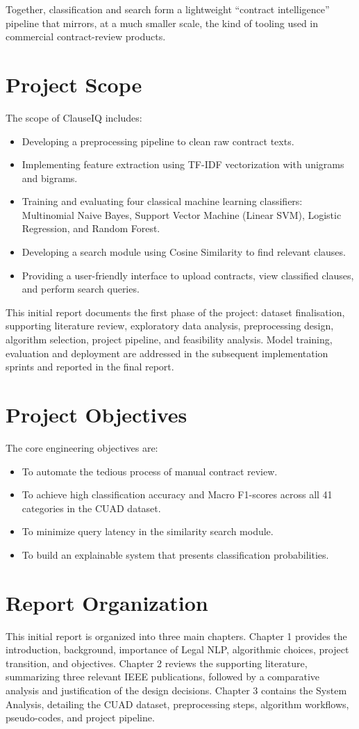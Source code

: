 \documentclass[12pt, a4paper]{report}
\begin{document}
Together, classification and search form a lightweight ``contract intelligence'' pipeline that mirrors, at a much smaller scale, the kind of tooling used in commercial contract-review products.

\section{Project Scope}
The scope of ClauseIQ includes:
\begin{itemize}
    \item Developing a preprocessing pipeline to clean raw contract texts.
    \item Implementing feature extraction using TF-IDF vectorization with unigrams and bigrams.
    \item Training and evaluating four classical machine learning classifiers: Multinomial Naive Bayes, Support Vector Machine (Linear SVM), Logistic Regression, and Random Forest.
    \item Developing a search module using Cosine Similarity to find relevant clauses.
    \item Providing a user-friendly interface to upload contracts, view classified clauses, and perform search queries.
\end{itemize}
This initial report documents the first phase of the project: dataset finalisation, supporting literature review, exploratory data analysis, preprocessing design, algorithm selection, project pipeline, and feasibility analysis. Model training, evaluation and deployment are addressed in the subsequent implementation sprints and reported in the final report.

\section{Project Objectives}
The core engineering objectives are:
\begin{itemize}
    \item To automate the tedious process of manual contract review.
    \item To achieve high classification accuracy and Macro F1-scores across all 41 categories in the CUAD dataset.
    \item To minimize query latency in the similarity search module.
    \item To build an explainable system that presents classification probabilities.
\end{itemize}

\section{Report Organization}
This initial report is organized into three main chapters. Chapter 1 provides the introduction, background, importance of Legal NLP, algorithmic choices, project transition, and objectives. Chapter 2 reviews the supporting literature, summarizing three relevant IEEE publications, followed by a comparative analysis and justification of the design decisions. Chapter 3 contains the System Analysis, detailing the CUAD dataset, preprocessing steps, algorithm workflows, pseudo-codes, and project pipeline.
\end{document}
